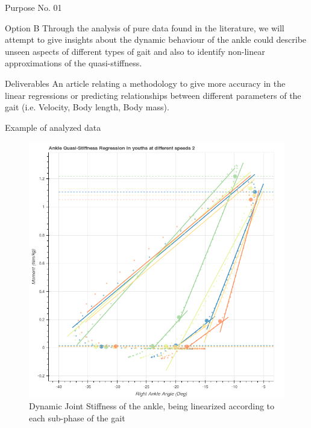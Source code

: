 \documentclass[10pt]{beamer}
\begin{document}
\begin{frame}{Purpose No. 01}
	\begin{block}{Option B}
	Through the analysis of pure data found in the literature, we will attempt to give insights about the dynamic behaviour of the ankle could describe unseen aspects of different types of gait and also to identify non-linear approximations of the quasi-stiffness. 
	\end{block}
	\begin{exampleblock}{Deliverables}
	An article relating a methodology to give more accuracy in the linear regressions or predicting relationships between different parameters of the gait (i.e. Velocity, Body length, Body mass).
	\end{exampleblock}
\end{frame}

\begin{frame}{Example of analyzed data}
\begin{figure}[H]
\begin{centering}
\includegraphics[scale=0.25]{quasistiffness.png}
\par\end{centering}

\caption{\label{fig:N=1} Dynamic Joint Stiffness of the ankle, being linearized according to each sub-phase of the gait}

\end{figure}
\end{frame}
\end{document}
